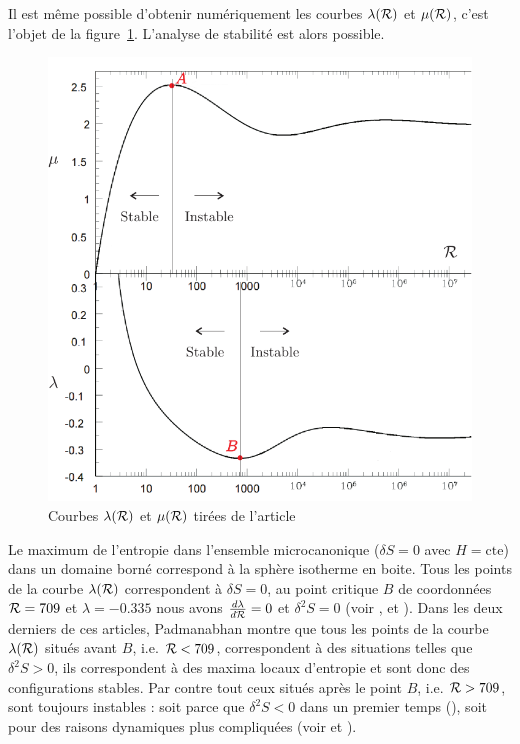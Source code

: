 	Il est même possible d'obtenir numériquement les courbes $\lambda(\mathcal{R})$ et $\mu(\mathcal{R})$, c'est l'objet de la figure~\ref{Cal_stab}. L'analyse de
	stabilité est alors possible. 
	\begin{figure}[h!]
		\centering \includegraphics[scale=1.00]{graphe/calorique_stabilite.pdf}
		\caption{Courbes $\lambda(\mathcal{R})$ et $\mu(\mathcal{R})$ tirées de l'article \cite{2011MNRAS.414.2728Y}}
		\label{Cal_stab}
	\end{figure}
	Le maximum de l'entropie dans l'ensemble microcanonique ($\delta S=0$ avec $H=\mathrm{cte}$) dans un domaine
	borné correspond à la sphère isotherme en boite. Tous les points de la courbe $\lambda(\mathcal{R})$ correspondent à
	$\delta S=0$, au point critique $B$ de coordonnées $\mathcal{R}=709$ et $\lambda=-0.335$ nous avons $\frac{d\lambda}{d\mathcal{R}}=0$ et
	$\delta^2 S=0$ (voir \cite{1968MNRAS.138..495L}, \cite{1989ApJS...71..651P} et \cite{1990PhR...188..285P}). Dans
	les deux derniers de ces articles, Padmanabhan montre que
	tous les points de la courbe $\lambda(\mathcal{R})$ situés avant $B$, i.e. $\mathcal{R} < 709$, correspondent à des situations
	telles que $\delta^2 S>0$, ils correspondent à des maxima locaux d'entropie et sont donc des configurations
	stables. Par contre tout ceux situés après le point $B$, i.e. $\mathcal{R} > 709$, sont toujours instables : soit parce
	que $\delta^2 S<0$ dans un premier temps (\cite{1989ApJS...71..651P}), soit pour des raisons dynamiques plus
	compliquées (voir \cite{Katz-Stab} et \cite{1979MNRAS.189..817K}). 
	

